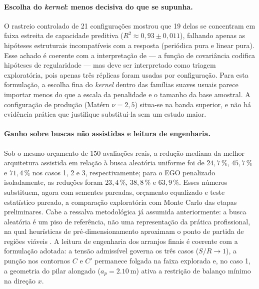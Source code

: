 \paragraph{Escolha do \textit{kernel}: menos decisiva do que se supunha.}
O rastreio controlado de 21 configurações mostrou que 19 delas se concentram em faixa estreita de capacidade preditiva ($R^2 \approx 0{,}93 \pm 0{,}011$), falhando apenas as hipóteses estruturais incompatíveis com a resposta (periódica pura e linear pura). Esse achado é coerente com a interpretação de  — a função de covariância codifica hipóteses de regularidade — mas deve ser interpretado como triagem exploratória, pois apenas três réplicas foram usadas por configuração. Para esta formulação, a escolha fina do \textit{kernel} dentro das famílias suaves usuais parece importar menos do que a escala da penalidade e o tamanho da base amostral. A configuração de produção (Matérn $\nu = 2{,}5$) situa-se na banda superior, e não há evidência prática que justifique substituí-la sem um estudo maior.

\paragraph{Ganho sobre buscas não assistidas e leitura de engenharia.}
Sob o mesmo orçamento de 150 avaliações reais, a redução mediana da melhor arquitetura assistida em relação à busca aleatória uniforme foi de $24{,}7\,\%$, $45{,}7\,\%$ e $71{,}4\,\%$ nos casos 1, 2 e 3, respectivamente; para o EGO penalizado isoladamente, as reduções foram $23{,}4\,\%$, $38{,}8\,\%$ e $63{,}9\,\%$. Esses números substituem, agora com sementes pareadas, orçamento equalizado e teste estatístico pareado, a comparação exploratória com Monte Carlo das etapas preliminares. Cabe a ressalva metodológica já assumida anteriormente: a busca aleatória é um piso de referência, não uma representação da prática profissional, na qual heurísticas de pré-dimensionamento aproximam o ponto de partida de regiões viáveis . A leitura de engenharia dos arranjos finais é coerente com a formulação adotada: a tensão admissível governa os três casos ($S/R \to 1$), a punção nos contornos $C$ e $C'$ permanece folgada na faixa explorada e, no caso 1, a geometria do pilar alongado ($a_p = \SI{2,10}{\meter}$) ativa a restrição de balanço mínimo na direção $x$.

